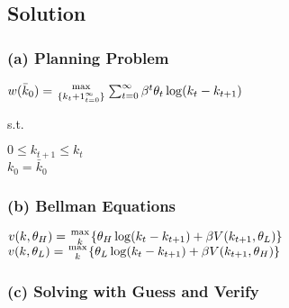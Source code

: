 \documentclass[10pt, a4paper]{article}
\begin{document}
  \subsection*{Solution}
    \subsubsection*{(a) Planning Problem}
    \begin{center}
      $w(\bar{k}_0) = {\max\atop{\{k_t+1}^{\infty}_{t=0}\}} \sum_{t=0}^{\infty}\beta^t\theta_t\log(k_t-k_{t+1})$
    \end{center}
    s.t.
    \begin{center}
      $0\leq k_{t+1}\leq k_t$ \\
      $k_0=\bar{k}_0$
    \end{center}
    \subsubsection*{(b) Bellman Equations}
    \begin{center}
      $v(k,\theta_H) = {\max\atop{k}}\{\theta_{H}\log(k_t-k_{t+1})+\beta V(k_{t+1},\theta_L)\}$ \\
      $v(k,\theta_L) = {\max\atop{k}}\{\theta_{L}\log(k_t-k_{t+1})+\beta V(k_{t+1},\theta_H)\}$ \\
    \end{center}
    \subsubsection*{(c) Solving with Guess and Verify}
    
\end{document}

